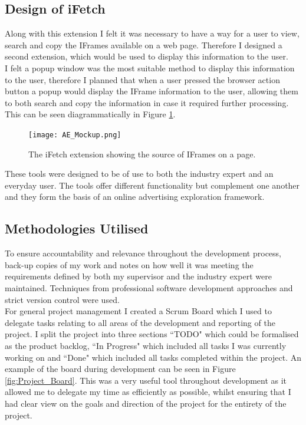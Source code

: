\documentclass[12pt]{article}
\begin{document}
\subsection{Design of iFetch}
Along with this extension I felt it was necessary to have a way for a user to view, search and copy the IFrames available on a web page. Therefore I designed a second extension, which would be used to display this information to the user. \\

I felt a popup window was the most suitable method to display this information to the user, therefore I planned that when a user pressed the browser action button a popup would display the IFrame information to the user, allowing them to both search and copy the information in case it required further processing. This can be seen diagrammatically in Figure \ref{fig:AE_Mockup}.

\begin{figure}[H]
    \centering
    \texttt{[image: AE\_Mockup.png]}
    \caption{The iFetch extension showing the source of IFrames on a page.}
    \label{fig:AE_Mockup}
\end{figure}

These tools were designed to be of use to both the industry expert and an everyday user. The tools offer different functionality but complement one another and they form the basis of an online advertising exploration framework. 

\subsection{Methodologies Utilised}
To ensure accountability and relevance throughout the development process, back-up copies of my work and notes on how well it was meeting the requirements defined by both my supervisor and the industry expert were maintained. Techniques from professional software development approaches and strict version control were used. \\

For general project management I created a Scrum Board which I used to delegate tasks relating to all areas of the development and reporting of the project. I split the project into three sections ``TODO" which could be formalised as the product backlog, ``In Progress" which included all tasks I was currently working on and ``Done" which included all tasks completed within the project. An example of the board during development can be seen in Figure \ref{fig:Project_Board}. This was a very useful tool throughout development as it allowed me to delegate my time as efficiently as possible, whilst ensuring that I had clear view on the goals and direction of the project for the entirety of the project.
\end{document}
